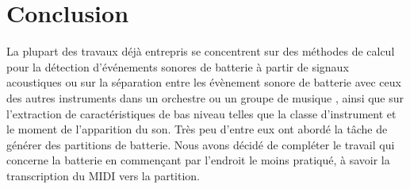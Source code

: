 \section*{Conclusion}
La plupart des travaux déjà entrepris se concentrent sur des méthodes de calcul pour la détection d'événements sonores de batterie à partir de signaux acoustiques ou sur la séparation entre les évènement sonore de batterie avec ceux des autres instruments dans un orchestre ou un groupe de musique \cite{2802}, ainsi que sur l'extraction de caractéristiques de bas niveau telles que la classe d'instrument et le moment de l'apparition du son. Très peu d'entre eux ont abordé la tâche de générer des partitions de batterie.
Nous avons décidé de compléter le travail qui concerne la batterie en commençant par l’endroit le moins pratiqué, à savoir la transcription du MIDI vers la partition.
